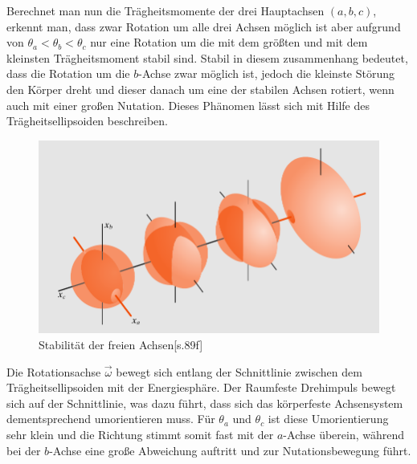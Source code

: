 \documentclass{include/protokollclass}
\begin{document}
    Berechnet man nun die Trägheitsmomente der drei Hauptachsen $(a,b,c)$, erkennt man, dass zwar Rotation um alle drei Achsen möglich ist aber aufgrund von $\theta_a <\theta_b<\theta_c$ nur eine Rotation um die mit dem größten und mit dem kleinsten Trägheitsmoment stabil sind. Stabil in diesem zusammenhang bedeutet, dass die Rotation um die $b$-Achse zwar möglich ist, jedoch die kleinste Störung den Körper dreht und dieser danach um eine der stabilen Achsen rotiert, wenn auch mit einer großen Nutation\cite[vgl. S.88f.]{Meschede2015}. Dieses Phänomen lässt sich mit Hilfe des Trägheitsellipsoiden beschreiben. 
    \begin{figure}[h]
        \centering
        \includegraphics[scale=0.5]{fig/traegheitsellipsoid.pdf}
        \caption{Stabilität der freien Achsen\cite{Meschede2015}[s.89f]}
        \label{fig:traegheitsellipsoid}
    \end{figure}
    Die Rotationsachse $\vec{\omega}$ bewegt sich entlang der Schnittlinie zwischen dem Trägheitsellipsoiden mit der Energiesphäre. Der Raumfeste Drehimpuls bewegt sich auf der Schnittlinie, was dazu führt, dass sich das körperfeste Achsensystem dementsprechend umorientieren muss. Für $\theta_a$ und $\theta_c$ ist diese Umorientierung sehr klein und die Richtung stimmt somit fast mit der $a$-Achse überein, während bei der $b$-Achse eine große Abweichung auftritt und zur Nutationsbewegung führt.
\end{document}
